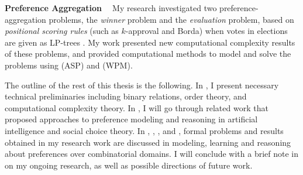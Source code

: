 \smallskip \noindent \textbf{Preference Aggregation  \ }
My research investigated two preference-aggregation 
problems, the \emph{winner} problem and the \emph{evaluation} problem,
based on \textit{positional scoring rules} (such as $k$-approval and Borda) 
when votes in elections are given as LP-trees \cite{abs/ijcai13dc/Liu,conf/adt13/LiuT}. 
My work presented new computational complexity results of these problems, and
provided computational methods to model and solve the problems using
 (ASP) and  (WPM).



The outline of the rest of this thesis is the following. 
In , I present necessary technical preliminaries
including binary relations, order theory, and computational complexity theory.
In , I will go through related work that proposed
approaches to preference modeling and reasoning
in artificial intelligence and social choice theory.
In ,  , , and ,
formal problems and results obtained in my research work are discussed
in modeling, learning and reasoning about preferences over combinatorial domains.
I will conclude with a brief note in  on my ongoing research,
as well as possible directions of future work.
